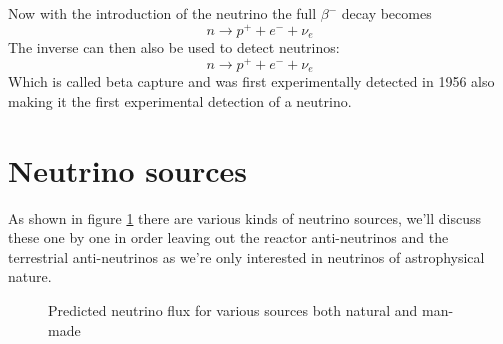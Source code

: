 \documentclass[11pt,a4paper,faculty=we,language=en,doctype=report]{cls/ugent-doc}
\begin{document}
Now with the introduction of the neutrino the full $\beta^-$ decay
becomes
\begin{equation}
	n \rightarrow p^+ + e^- + \nu_e
\end{equation}
The inverse can then also be used to detect neutrinos:
\begin{equation}
	n \rightarrow p^+ + e^- + \nu_e
\end{equation}
Which is called beta capture and was first experimentally detected in 1956
\cite{BetaCapture} also making it the first experimental detection of a
neutrino.
\section{Neutrino sources}
As shown in figure \ref{figure:Neutrino fluxes} there are various kinds of
neutrino sources, we'll discuss these one by one in order leaving out the
reactor anti-neutrinos and the terrestrial anti-neutrinos as we're only
interested in neutrinos of astrophysical nature.
\begin{figure}
	\centering
	\caption{Predicted neutrino flux for various sources both natural and man-made}
	\label{figure:Neutrino fluxes}
\end{figure}
\end{document}
